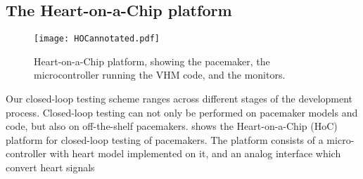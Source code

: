 \subsection{The Heart-on-a-Chip platform}
\label{HoC}

\begin{figure}[!t]
	\centering
	\texttt{[image: HOCannotated.pdf]}		
	\caption{\small Heart-on-a-Chip platform, showing the pacemaker, the microcontroller running the VHM code, and the monitors.}
	\label{fig:hoc}
\end{figure} 
Our closed-loop testing scheme ranges across different stages of the development process. Closed-loop testing can not only be performed on pacemaker models and code, but also on off-the-shelf pacemakers.  shows the Heart-on-a-Chip (HoC) platform for closed-loop testing of pacemakers. The platform consists of a micro-controller with heart model implemented on it, and an analog interface which convert heart signals
